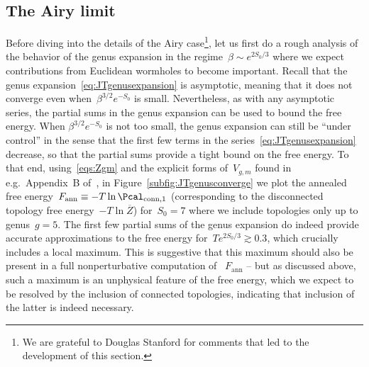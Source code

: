 \documentclass[12pt]{article}
\newcommand{\adm}[1]{\textcolor{purple}{(#1)}}
\begin{document}
\subsection{The Airy limit}
\label{subsec:Airy}

Before diving into the details of the Airy case\footnote{We are grateful to Douglas Stanford for comments that led to the development of this section.}, let us first do a rough analysis of the behavior of the genus expansion in the regime~$\beta \sim e^{2S_0/3}$ where we expect contributions from Euclidean wormholes to become important.  Recall that the genus expansion~\eqref{eq:JTgenusexpansion} is asymptotic, meaning that it does not converge even when~$\beta^{3/2} e^{-S_0}$ is small.  
Nevertheless, as with any asymptotic series, the partial sums in the genus expansion can be used to bound the free energy.
When $\beta^{3/2} e^{-S_0}$ is not too small, the genus expansion can still be ``under control'' in the sense that the first few
terms in the series~\eqref{eq:JTgenusexpansion} decrease,
so that the partial sums provide a tight bound on the free energy.
To that end, using~\eqref{eqs:Zgm} and the explicit forms of~$V_{g,m}$ found in e.g.~Appendix~B of~\cite{Do11}, in Figure~\ref{subfig:JTgenusconverge} we plot the annealed free energy~$F_\mathrm{ann} \equiv -T \ln \Pcal_{\mathrm{conn},1}$ (corresponding to the disconnected topology free energy~$-T \ln \overline{Z}$) for~$S_0 = 7$ where we include topologies only up to genus~$g = 5$.  The first few partial sums of the genus expansion do indeed provide accurate approximations to the free energy for~$T e^{2S_0/3} \gtrsim 0.3$, which crucially includes a local maximum.  This is suggestive that this maximum should also be present in a full nonperturbative computation of ~$F_\mathrm{ann}$ %
-- but as discussed above, such a maximum is an unphysical feature of the free energy, which we expect to be resolved by the inclusion of connected topologies, %
indicating that inclusion of the latter is indeed necessary.
\end{document}
